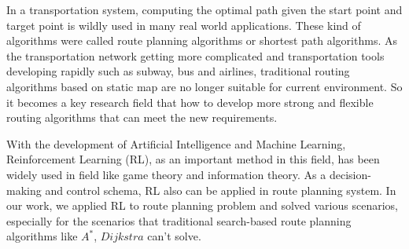 \documentclass{standalone}
\begin{document}
\begin{englishabstract}

	In a transportation system, computing the optimal path given the start point and target point is wildly used in many real world applications. These kind of algorithms were called route planning algorithms or shortest path algorithms. As the transportation network getting more complicated and transportation tools developing rapidly such as subway, bus and airlines, traditional routing algorithms based on static map are no longer suitable for current environment. So it becomes a key research field that how to develop more strong and flexible routing algorithms that can meet the new requirements.

    With the development of Artificial Intelligence and Machine Learning, Reinforcement Learning (RL), as an important method in this field, has been widely used in field like game theory and information theory. As a decision-making and control schema, RL also can be applied in route planning system. In our work, we applied RL to route planning problem and solved various scenarios, especially for the scenarios that traditional search-based route planning algorithms like $A^*$, $Dijkstra$ can't solve.
    
  
\end{englishabstract}
\end{document}
